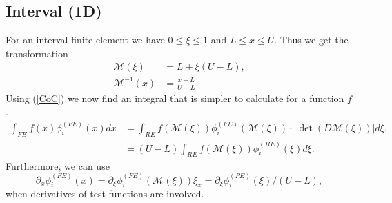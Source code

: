 \documentclass[12pt]{ociamthesis}
\begin{document}
\subsection{Interval (1D)}
For an interval finite element we have $0\leq\xi\leq1$ and $L \leq x \leq U$. Thus we get the transformation
\begin{align}
\mathcal{M}(\xi) &= L + \xi(U-L),\\
\mathcal{M}^{-1}(x) &= \frac{x-L}{U-L}.
\end{align}
Using (\ref{CoC}) we now find an integral that is simpler to calculate for a function $f$.
\begin{align}
\int_{FE} f(x)\phi_i^{(FE)}(x) dx &=
\int_{RE}f(\mathcal{M}(\xi))\phi_i^{(FE)}(\mathcal{M}(\xi))\cdot |\det(D\mathcal{M}(\xi))| d\xi, \\
&= (U-L) \int_{RE}f(\mathcal{M}(\xi)) \phi_i^{(RE)}(\xi) d\xi.
\end{align}
Furthermore, we can use 
\begin{equation}
\partial_x \phi_i^{(FE)}(x) =
\partial_{\xi}\phi_i^{(FE)}(\mathcal{M}(\xi)) \xi_x = 
\partial_{\xi}\phi_i^{(PE)}(\xi)/(U-L),
\end{equation}
when derivatives of test functions are involved.
\end{document}
